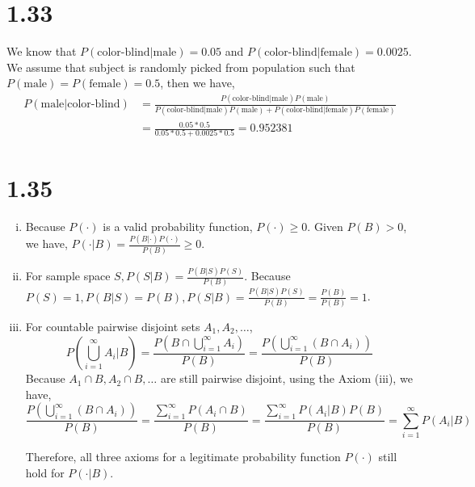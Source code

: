 \documentclass[letterpaper]{article}
\begin{document}

    \section*{1.33}
    We know that $P(\text{color-blind}|\text{male}) = 0.05$ and $P(\text{color-blind}|\text{female}) = 0.0025$. 
    We assume that subject is randomly picked from population such that $P(\text{male}) = P(\text{female}) = 0.5$, then we have,
    \begin{align*}
    P(\text{male}|\text{color-blind}) & = \frac{P(\text{color-blind}|\text{male})P(\text{male})}{P(\text{color-blind}|\text{male})P(\text{male}) + P(\text{color-blind}|\text{female})P(\text{female})} \\ 
    & = \frac{0.05 * 0.5}{0.05*0.5 + 0.0025 * 0.5} = 0.952381
    \end{align*}

    \section*{1.35}
    \begin{enumerate}[(i)]
    \item Because $P(\cdot)$ is a valid probability function, $P(\cdot) \geq 0$. Given $P(B) > 0$, we have, $P(\cdot|B) = \frac{P(B|\cdot)P(\cdot)}{P(B)} \geq 0$. 
    \item For sample space $S, P(S|B) = \frac{P(B|S)P(S)}{P(B)}$. Because $P(S) = 1, P(B|S) = P(B), P(S|B) = \frac{P(B|S)P(S)}{P(B)} = \frac{P(B)}{P(B)} = 1$.
    \item For countable pairwise disjoint sets $A_1, A_2, \dots$, 
    \[
    P\left(\bigcup_{i=1}^{\infty} A_i \lvert B \right) = \frac{P\left(B \cap \bigcup_{i=1}^{\infty} A_i \right)}{P(B)} = \frac{P\left(\bigcup_{i=1}^{\infty} (B \cap A_i) \right)}{P(B)}
    \]
    Because $A_1 \cap B, A_2 \cap B, \dots$ are still pairwise disjoint, using the Axiom (iii), we have,
    \[
    \frac{P\left(\bigcup_{i=1}^{\infty} (B \cap A_i)\right)}{P(B)} = \frac{\sum_{i=1}^{\infty} P(A_i \cap B)}{P(B)} = \frac{\sum_{i=1}^{\infty} P(A_i|B)P(B)}{P(B)} = \sum_{i=1}^{\infty} P(A_i|B)
    \]

    Therefore, all three axioms for a legitimate probability function $P(\cdot)$ still hold for $P(\cdot|B)$.
    \end{enumerate}
\end{document}
